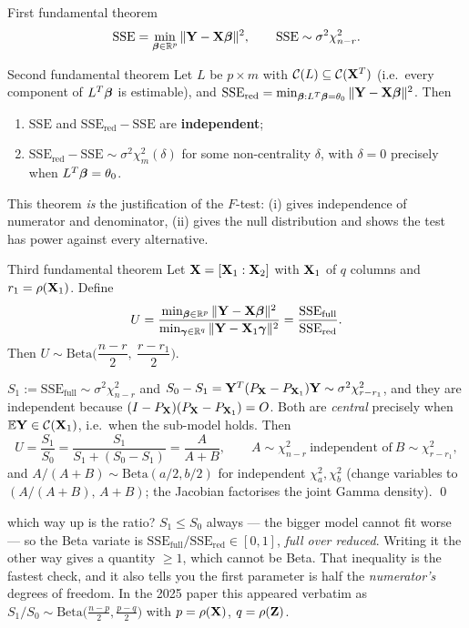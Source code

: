 \documentclass[11pt]{article}
\begin{document}
\begin{idea}{First fundamental theorem}
\[
  \mathrm{SSE}=\min_{\boldsymbol{\beta}\in\mathbb{R}^p}\|\mathbf{Y}-\mathbf{X}\boldsymbol{\beta}\|^2, \qquad \mathrm{SSE}\sim\sigma^2\chi^2_{n-r} .
\]
\end{idea}

\begin{idea}{Second fundamental theorem}
Let $L$ be $p\times m$ with $\mathcal{C}(L)\subseteq\mathcal{C}(\mathbf{X}^T)$ (i.e.\ every component of $L^T\boldsymbol{\beta}$ is
estimable), and $\mathrm{SSE}_{\text{red}}=\min_{\boldsymbol{\beta}:L^T\boldsymbol{\beta}=\theta_0}\|\mathbf{Y}-\mathbf{X}\boldsymbol{\beta}\|^2$. Then
\begin{enumerate}[label=(\roman*)]
  \item $\mathrm{SSE}$ and $\mathrm{SSE}_{\text{red}}-\mathrm{SSE}$ are \textbf{independent};
  \item $\mathrm{SSE}_{\text{red}}-\mathrm{SSE}\sim\sigma^2\chi^2_m(\delta)$ for some non-centrality
        $\delta$, with $\delta=0$ precisely when $L^T\boldsymbol{\beta}=\theta_0$.
\end{enumerate}
\end{idea}

This theorem \emph{is} the justification of the $F$-test: (i) gives independence of numerator
and denominator, (ii) gives the null distribution and shows the test has power against every
alternative.

\begin{idea}{Third fundamental theorem}
Let $\mathbf{X}=[\mathbf{X}_1:\mathbf{X}_2]$ with $\mathbf{X}_1$ of $q$ columns and $r_1=\rho(\mathbf{X}_1)$. Define
\[
  U=\frac{\min_{\boldsymbol{\beta}\in\mathbb{R}^p}\|\mathbf{Y}-\mathbf{X}\boldsymbol{\beta}\|^2}{\min_{\boldsymbol\gamma\in\mathbb{R}^q}\|\mathbf{Y}-\mathbf{X}_1\boldsymbol\gamma\|^2}
   =\frac{\mathrm{SSE}_{\text{full}}}{\mathrm{SSE}_{\text{red}}} .
\]
Then $U\sim \mathrm{Beta}\Big(\dfrac{n-r}{2},\ \dfrac{r-r_1}{2}\Big)$.
\end{idea}
\prf $S_1:=\mathrm{SSE}_{\text{full}}\sim\sigma^2\chi^2_{n-r}$ and
$S_0-S_1=\mathbf{Y}^T(P_{\mathbf{X}}-P_{\mathbf{X}_1})\mathbf{Y}\sim\sigma^2\chi^2_{r-r_1}$, and they are independent
because $(I-P_{\mathbf{X}})(P_{\mathbf{X}}-P_{\mathbf{X}_1})=O$. Both are \emph{central} precisely when
$\mathbb{E}\mathbf{Y}\in\mathcal{C}(\mathbf{X}_1)$, i.e.\ when the sub-model holds. Then
\[
  U=\frac{S_1}{S_0}=\frac{S_1}{S_1+(S_0-S_1)}=\frac{A}{A+B},
  \qquad A\sim\chi^2_{n-r}\ \text{independent of}\ B\sim\chi^2_{r-r_1},
\]
and $A/(A+B)\sim\mathrm{Beta}(a/2,b/2)$ for independent $\chi^2_a,\chi^2_b$ (change variables
to $(A/(A+B),\,A+B)$; the Jacobian factorises the joint Gamma density). \qed

\begin{confusion}{which way up is the ratio?}
$S_1\le S_0$ always --- the bigger model cannot fit worse --- so the Beta variate is
$\mathrm{SSE}_{\text{full}}/\mathrm{SSE}_{\text{red}}\in[0,1]$, \emph{full over reduced}. Writing it the
other way gives a quantity $\ge1$, which cannot be Beta. That inequality is the fastest
check, and it also tells you the first parameter is half the \emph{numerator's} degrees of
freedom. In the 2025 paper this appeared verbatim as
$S_1/S_0\sim\mathrm{Beta}\big(\tfrac{n-p}{2},\tfrac{p-q}{2}\big)$ with $p=\rho(\mathbf{X})$,
$q=\rho(\mathbf{Z})$.
\end{confusion}
\end{document}
